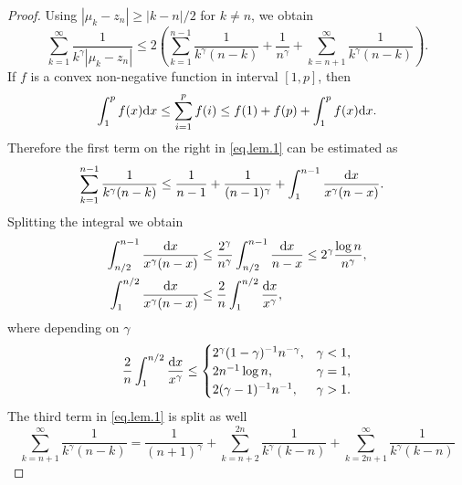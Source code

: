\begin{proof}
Using $|\mu_k-z_n|\geq |k-n|/2$ for $k\neq n$, we obtain
\begin{equation}
\label{eq.lem.1}
\sum_{k=1}^{\infty} \frac{1}{k^{\gamma}|\mu_k-z_n| } \leq 
2
\left( \sum_{k=1}^{n-1} \frac{1}{k^{\gamma}(n-k) } +
\frac{1}{n^{\gamma}}
+ \sum_{k=n+1}^{\infty} \frac{1}{k^{\gamma}(n-k) }
\right)
.
\end{equation}
If $f$ is a convex non-negative function in interval $[1,p]$, then
\begin{equation*}
\int_1^p f(x) {{{\rm d}}} x \leq \sum_{i=1}^p f(i) \leq f(1) + f(p) + \int_1^p f(x) {{{\rm d}}} x.
\end{equation*}
Therefore the first term on the right in \eqref{eq.lem.1} can be estimated as
\begin{equation*}
\begin{aligned}
&\sum_{k=1}^{n-1} \frac{1}{k^{\gamma}(n-k) } 
\leq 
\frac{1}{n-1} + \frac{1}{(n-1)^{\gamma}} + \int_{1}^{n-1} \frac{{{{\rm d}}} x}{x^{\gamma} (n-x) }.
\end{aligned}
\end{equation*}
Splitting the integral we obtain
\begin{equation*}
\begin{aligned}
\int_{n/2}^{n-1} \frac{{{{\rm d}}} x}{x^{\gamma} (n-x) }
&\leq 
\frac{2^{\gamma}}{n^{\gamma}} \int_{n/2}^{n-1} \frac{{{{\rm d}}} x}{n-x}
\leq
2^{\gamma} \frac{\log n}{n^{\gamma}},
\\
\int_1^{n/2} \frac{{{{\rm d}}} x}{x^{\gamma} (n-x) }
&\leq 
\frac{2}{n} \int_1^{n/2} \frac{{{{\rm d}}} x}{x^{\gamma}},
\end{aligned}
\end{equation*}
where depending on $\gamma$
\begin{equation*}
\frac{2}{n} \int_1^{n/2} \frac{{{{\rm d}}} x}{x^{\gamma}} \leq 
\begin{cases}
2^{\gamma}(1-\gamma)^{-1} n^{-\gamma}, & \gamma <1, \\
2 n^{-1} \log n, & \gamma =1, \\
2 (\gamma-1)^{-1} n^{-1}, & \gamma >1.
\end{cases}
\end{equation*}
The third term in \eqref{eq.lem.1} is split as well
\begin{equation*}
\sum_{k=n+1}^{\infty} \frac{1}{k^{\gamma}(n-k) } = 
\frac{1}{(n+1)^{\gamma}} +
\sum_{k=n+2}^{2n} \frac{1}{k^{\gamma}(k-n) } + \sum_{k=2n+1}^{\infty} \frac{1}{k^{\gamma}(k-n) }
\end{equation*}

\end{proof}
